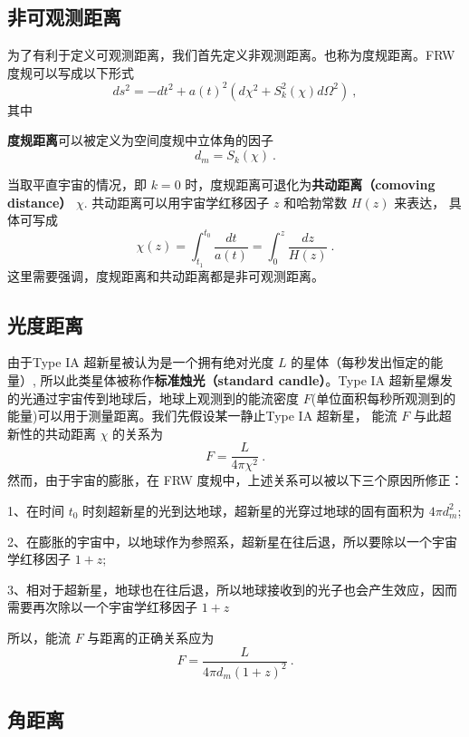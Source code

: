 
\begin{issues}
\issueDraft
\end{issues}


\subsection{非可观测距离}
为了有利于定义可观测距离，我们首先定义非观测距离。也称为度规距离。FRW 度规可以写成以下形式
\begin{equation}
ds^2=-dt^2+a(t)^2(d\chi^2+S^2_k (\chi) d\Omega^2)~,
\end{equation}
其中
\addTODO{[xxx]}

\textbf{度规距离}可以被定义为空间度规中立体角的因子
\begin{equation}
d_m=S_k(\chi)~.
\end{equation}

当取平直宇宙的情况，即 $k=0$ 时，度规距离可退化为\textbf{共动距离（comoving distance）} $\chi$. 共动距离可以用宇宙学红移因子 $z$ 和哈勃常数 $H(z)$ 来表达， 具体可写成
\begin{equation}
\chi(z)=\int^{t_0}_{t_1} \frac{dt}{a(t)}=\int^z_0 \frac{dz}{H(z)}~.
\end{equation}
这里需要强调，度规距离和共动距离都是非可观测距离。

\subsection{光度距离}
由于Type IA 超新星被认为是一个拥有绝对光度 $L$ 的星体（每秒发出恒定的能量）, 所以此类星体被称作\textbf{标准烛光（standard candle）}。Type IA 超新星爆发的光通过宇宙传到地球后，地球上观测到的能流密度 $F$(单位面积每秒所观测到的能量)可以用于测量距离。我们先假设某一静止Type IA 超新星， 能流 $F$ 与此超新性的共动距离 $\chi$ 的关系为
\begin{equation}
F=\frac{L}{4\pi \chi^2}~.
\end{equation}
然而，由于宇宙的膨胀，在 FRW 度规中，上述关系可以被以下三个原因所修正：

1、在时间 $t_0$ 时刻超新星的光到达地球，超新星的光穿过地球的固有面积为 $4\pi d_m^2$;

2、在膨胀的宇宙中，以地球作为参照系，超新星在往后退，所以要除以一个宇宙学红移因子 $1+z$;

3、相对于超新星，地球也在往后退，所以地球接收到的光子也会产生效应，因而需要再次除以一个宇宙学红移因子 $1+z$

所以，能流 $F$ 与距离的正确关系应为
\begin{equation}
F=\frac{L}{4\pi d_m (1+z)^2}~.
\end{equation}

\subsection{角距离}
